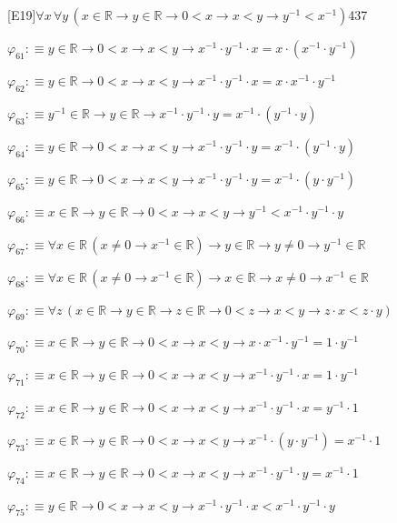\begin{fullproof}{[E19]}{$\forall x\,\forall y\,(x \in \mathbb{R} \to y \in \mathbb{R} \to 0 < x \to x < y \to y^{-1} < x^{-1})$}{437}
\begin{abbrevlist}
\item $\varphi_{61} :\equiv y \in \mathbb{R} \to 0 < x \to x < y \to x^{-1} \cdot y^{-1} \cdot x = x \cdot (x^{-1} \cdot y^{-1})$
\item $\varphi_{62} :\equiv y \in \mathbb{R} \to 0 < x \to x < y \to x^{-1} \cdot y^{-1} \cdot x = x \cdot x^{-1} \cdot y^{-1}$
\item $\varphi_{63} :\equiv y^{-1} \in \mathbb{R} \to y \in \mathbb{R} \to x^{-1} \cdot y^{-1} \cdot y = x^{-1} \cdot (y^{-1} \cdot y)$
\item $\varphi_{64} :\equiv y \in \mathbb{R} \to 0 < x \to x < y \to x^{-1} \cdot y^{-1} \cdot y = x^{-1} \cdot (y^{-1} \cdot y)$
\item $\varphi_{65} :\equiv y \in \mathbb{R} \to 0 < x \to x < y \to x^{-1} \cdot y^{-1} \cdot y = x^{-1} \cdot (y \cdot y^{-1})$
\item $\varphi_{66} :\equiv x \in \mathbb{R} \to y \in \mathbb{R} \to 0 < x \to x < y \to y^{-1} < x^{-1} \cdot y^{-1} \cdot y$
\item $\varphi_{67} :\equiv \forall x \in \mathbb{R}\,(x \neq 0 \to x^{-1} \in \mathbb{R}) \to y \in \mathbb{R} \to y \neq 0 \to y^{-1} \in \mathbb{R}$
\item $\varphi_{68} :\equiv \forall x \in \mathbb{R}\,(x \neq 0 \to x^{-1} \in \mathbb{R}) \to x \in \mathbb{R} \to x \neq 0 \to x^{-1} \in \mathbb{R}$
\item $\varphi_{69} :\equiv \forall z\,(x \in \mathbb{R} \to y \in \mathbb{R} \to z \in \mathbb{R} \to 0 < z \to x < y \to z \cdot x < z \cdot y)$
\item $\varphi_{70} :\equiv x \in \mathbb{R} \to y \in \mathbb{R} \to 0 < x \to x < y \to x \cdot x^{-1} \cdot y^{-1} = 1 \cdot y^{-1}$
\item $\varphi_{71} :\equiv x \in \mathbb{R} \to y \in \mathbb{R} \to 0 < x \to x < y \to x^{-1} \cdot y^{-1} \cdot x = 1 \cdot y^{-1}$
\item $\varphi_{72} :\equiv x \in \mathbb{R} \to y \in \mathbb{R} \to 0 < x \to x < y \to x^{-1} \cdot y^{-1} \cdot x = y^{-1} \cdot 1$
\item $\varphi_{73} :\equiv x \in \mathbb{R} \to y \in \mathbb{R} \to 0 < x \to x < y \to x^{-1} \cdot (y \cdot y^{-1}) = x^{-1} \cdot 1$
\item $\varphi_{74} :\equiv x \in \mathbb{R} \to y \in \mathbb{R} \to 0 < x \to x < y \to x^{-1} \cdot y^{-1} \cdot y = x^{-1} \cdot 1$
\item $\varphi_{75} :\equiv y \in \mathbb{R} \to 0 < x \to x < y \to x^{-1} \cdot y^{-1} \cdot x < x^{-1} \cdot y^{-1} \cdot y$

\end{abbrevlist}
\end{fullproof}
